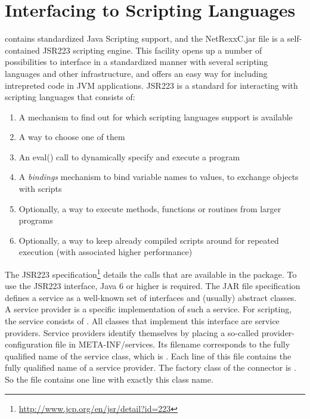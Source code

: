 \chapter{Interfacing to Scripting Languages}
\nr{} contains standardized Java Scripting
support, and the NetRexxC.jar file is a self-contained JSR223 scripting engine. This facility opens up a number of possibilities to interface in a standardized manner with several scripting languages and other infrastructure, and offers an easy way for including intrepreted \nr{} code in JVM applications. JSR223 is a standard for interacting with scripting languages that consists of:
\begin{enumerate}
\item A mechanism to find out for which scripting languages support is
  available
\item A way to choose one of them
\item An eval() call to dynamically specify and execute a program
\item A \emph{bindings} mechanism to bind variable names to values, to exchange objects with scripts
\item Optionally, a way to execute methods, functions or routines from
  larger programs
\item Optionally, a way to keep already compiled scripts around for repeated execution (with associated higher performance)
\end{enumerate}

The JSR223 specification\footnote{\url{http://www.jcp.org/en/jsr/detail?id=223}}
details the calls that are available in the 
package. To use the JSR223 interface, Java 6 or higher is
required. The JAR file specification defines a service as a well-known
set of interfaces and (usually) abstract classes. A service provider
is a specific implementation of such a service. For scripting, the
service consists of . All
classes that implement this interface are service providers. Service
providers identify themselves by placing a so-called
provider-configuration file in META-INF/services. Its filename
corresponds to the fully qualified name of the service class, which is
. Each line of this file contains the
fully qualified name of a service provider. The factory
class of the \nr{} connector is . So the file  contains one line with exactly this class name.
